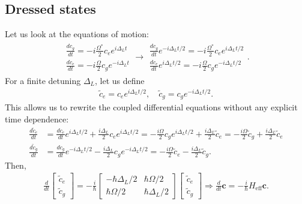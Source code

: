 \subsection{Dressed states}
Let us look at the equations of motion:
\begin{align*}
    \begin{array}{l}
        \displaystyle\frac{dc_g}{dt}=-i\frac{\Omega^*}{2}c_ee^{i\Delta_Lt}\\
        \displaystyle\frac{dc_e}{dt}=-i\frac{\Omega}{2}c_ge^{-i\Delta_Lt}
    \end{array}\longrightarrow
    \begin{array}{l}
        \displaystyle\frac{dc_g}{dt}e^{-i\Delta_Lt/2}=-i\frac{\Omega^*}{2}c_ee^{i\Delta_Lt/2}\\
        \displaystyle\frac{dc_e}{dt}e^{i\Delta_Lt/2}=-i\frac{\Omega}{2}c_ge^{-i\Delta_Lt/2}
    \end{array}.   
\end{align*}
For a finite detuning $\Delta_L$, let us define 
\begin{align}
    \tilde{c}_e=c_ee^{i\Delta_Lt/2},\quad\tilde{c}_g=c_ge^{-i\Delta_Lt/2}.
\end{align}
This allows us to rewrite the coupled differential equations without any explicit time dependence:
\begin{align*}
    \frac{d\tilde{c}_e}{dt}&=\frac{dc_e}{dt}e^{i\Delta_Lt/2}+\frac{i\Delta_L}{2}c_ee^{i\Delta_Lt/2}=-\frac{i\Omega}{2}c_ge^{i\Delta_Lt/2}+\frac{i\Delta_L}{2}\tilde{c}_e=
    -\frac{i\Omega}{2}\tilde{c}_g+\frac{i\Delta_L}{2}\tilde{c}_e\\
    \frac{d\tilde{c}_g}{dt}&=\frac{dc_g}{dt}e^{-i\Delta_Lt/2}-\frac{i\Delta_L}{2}c_ge^{-i\Delta_Lt/2}=-\frac{i\Omega}{2}\tilde{c}_e-\frac{i\Delta_L}{2}\tilde{c}_g.
\end{align*}
Then,
\begin{align}
    \frac{d}{dt}\begin{bmatrix}
        \tilde{c}_e\\\tilde{c}_g
    \end{bmatrix}=-\frac{i}{\hbar}\begin{bmatrix}
        -\hbar\Delta_L/2&\hbar\Omega/2\\\hbar\Omega/2&\hbar\Delta_L/2
    \end{bmatrix}\begin{bmatrix}
        \tilde{c}_e\\\tilde{c}_g
    \end{bmatrix}\Longrightarrow \frac{d}{dt}\bm{c}=-\frac{i}{\hbar}H_{\mathrm{eff}}\bm{c}.
\end{align}
